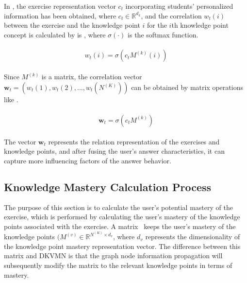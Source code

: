 In \eqname{\ref{fml:ch3-sbcap}}, the exercise representation vector \(c_t\) incorporating students' personalized information has been obtained, where \(c_t\in\mathbb{R}^{d_k}\), and the correlation \(w_t(i)\) between the exercise and the knowledge point \(i\) for the \(i\)th knowledge point concept is calculated by is \eqname{\ref{fml:ch3-corkq}}, where \(\sigma(\cdot)\) is the softmax function.

\begin{align}\label{fml:ch3-corkq}
    \begin{split}
        w_t(i)=\sigma(c_t M^{(k)}(i))
    \end{split}
\end{align}

Since \(M^{(k)}\) is a matrix, the correlation vector \(\mathbf{w}_t=(w_t(1),w_t(2),\ldots,w_t(N^{(K)}))\) can be obtained by matrix operations like \eqname{\ref{fml:ch3-corkq-mat}}.

\begin{align}\label{fml:ch3-corkq-mat}
    \begin{split}
        \mathbf{w}_t=\sigma(c_t M^{(k)})
    \end{split}
\end{align}

The vector \(\mathbf{w}_t\) represents the relation representation of the exercises and knowledge points, and after fusing the user's answer characteristics, it can capture more influencing factors of the answer behavior.

\subsection{Knowledge Mastery Calculation Process}

The purpose of this section is to calculate the user's potential mastery of the exercise, which is performed by calculating the user's mastery of the knowledge points associated with the exercise. A matrix \ keeps the user's mastery of the knowledge points \((M^{(v)}\in\mathbb{R}^{N^{(K)}\times d_v}\), where \(d_v\) represents the dimensionality of the knowledge point mastery representation vector. The difference between this matrix and DKVMN is that the graph node information propagation will subsequently modify the matrix to the relevant knowledge points in terms of mastery.

